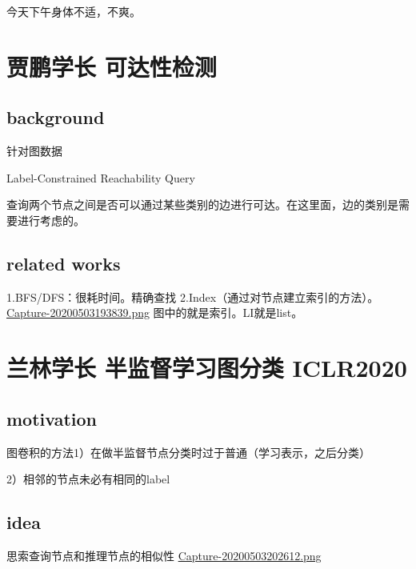 \documentclass[11pt]{article}
\date{\today}
\title{}
\begin{document}
\tableofcontents

今天下午身体不适，不爽。

\section{贾鹏学长  可达性检测}
\label{sec:org92fa8c0}
\subsection{background}
\label{sec:org8b71d02}
针对图数据

Label-Constrained Reachability Query

查询两个节点之间是否可以通过某些类别的边进行可达。在这里面，边的类别是需要进行考虑的。

\subsection{related works}
\label{sec:org3e96426}
1.BFS/DFS：很耗时间。精确查找
2.Index（通过对节点建立索引的方法）。
\href{./images/20200503193839.png}{Capture-20200503193839.png}
图中的就是索引。LI就是list。

\section{兰林学长 半监督学习图分类 ICLR2020}
\label{sec:orga2210c6}
\subsection{motivation}
\label{sec:org6f80107}
图卷积的方法1）在做半监督节点分类时过于普通（学习表示，之后分类）

2）相邻的节点未必有相同的label

\subsection{idea}
\label{sec:orgff32062}
思索查询节点和推理节点的相似性
\href{./images/20200503202612.png}{Capture-20200503202612.png}
\end{document}
